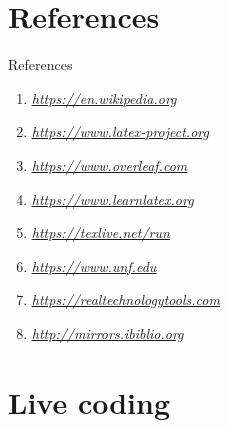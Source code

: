 \documentclass[10pt,xcolor={dvipsnames}]{beamer}
\begin{document}
\section{References}
\begin{frame}{References}
	\begin{enumerate}
		\item \href{https://en.wikipedia.org/wiki/LaTeX}{\textit{\underline{https://en.wikipedia.org}}}
		\item \href{https://www.latex-project.org/get/}{\textit{\underline{https://www.latex-project.org}}}
		\item \href{https://www.overleaf.com/learn/latex/Tutorials?&nocdn=true}{\textit{\underline{https://www.overleaf.com}}}
		\item \href{https://www.learnlatex.org/en/}{\textit{\underline{https://www.learnlatex.org}}}
		\item \href{https://texlive.net/run}{\textit{\underline{https://texlive.net/run}}}
		\item \href{https://www.unf.edu/~wkloster/latex/bib.html}{\textit{\underline{https://www.unf.edu}}}
		\item \href{https://realtechnologytools.com/latex-template/}{\textit{\underline{https://realtechnologytools.com}}}
		\item \href{http://mirrors.ibiblio.org/CTAN/macros/xetex/latex/xepersian/xepersian-doc.pdf}{\textit{\underline{http://mirrors.ibiblio.org}}}
	\end{enumerate}
\end{frame}

		
\section{Live coding}
	\begin{frame}
	\end{frame}
\end{document}
